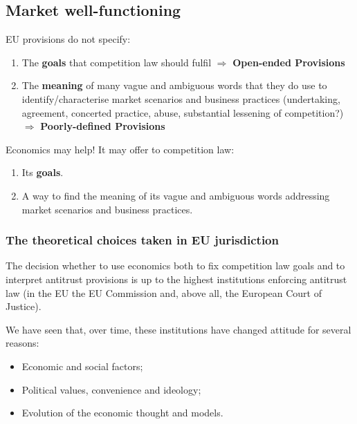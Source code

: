     \subsection{Market well-functioning}

        EU provisions do not specify:

            \begin{enumerate}
                \item The \textbf{goals} that competition law should fulfil \(\Rightarrow\) \textbf{Open-ended Provisions}
                \item The \textbf{meaning} of many vague and ambiguous words that they do use to identify/characterise market scenarios and business practices (undertaking, agreement, concerted practice, abuse, substantial lessening of competition?) \(\Rightarrow\) \textbf{Poorly-defined Provisions}
            \end{enumerate}

        Economics may help! It may offer to competition law:

            \begin{enumerate}
                \item Its \textbf{goals}.
                \item A way to find the meaning of its vague and ambiguous words addressing market scenarios and business practices.
            \end{enumerate}

        \subsubsection{The theoretical choices taken in EU jurisdiction}

            The decision whether to use economics both to fix competition law goals and to interpret antitrust provisions is up to the highest institutions enforcing antitrust law (in the EU the EU Commission and, above all, the European Court of Justice).

            We have seen that, over time, these institutions have changed attitude for several reasons:
            \begin{itemize}
                \item Economic and social factors;
                \item Political values, convenience and ideology;
                \item Evolution of the economic thought and models.
            \end{itemize}

